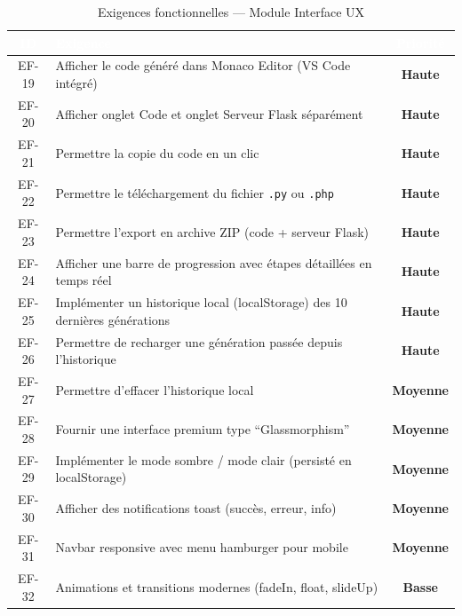 \documentclass[12pt,a4paper]{article}
\newcommand{\badge}[2]{%
  \colorbox{#1!15}{\textcolor{#1}{\small\textbf{#2}}}%
}
\newcommand{\highpriority}{\badge{dangered}{Haute}}
\newcommand{\mediumpriority}{\badge{warningorange}{Moyenne}}
\newcommand{\lowpriority}{\badge{successgreen}{Basse}}
\begin{document}
\begin{table}[H]
\centering
\renewcommand{\arraystretch}{1.3}
\begin{tabularx}{\textwidth}{|c|X|c|}
\hline
\rowcolor{darkblue!90}
\textcolor{white}{\textbf{ID}} &
\textcolor{white}{\textbf{Exigence}} &
\textcolor{white}{\textbf{Priorité}} \\
\hline
EF-19 & Afficher le code généré dans Monaco Editor (VS Code intégré) & \highpriority \\
\hline
\rowcolor{lightgray}
EF-20 & Afficher onglet Code et onglet Serveur Flask séparément & \highpriority \\
\hline
EF-21 & Permettre la copie du code en un clic & \highpriority \\
\hline
\rowcolor{lightgray}
EF-22 & Permettre le téléchargement du fichier \texttt{.py} ou \texttt{.php} & \highpriority \\
\hline
EF-23 & Permettre l'export en archive ZIP (code + serveur Flask) & \highpriority \\
\hline
\rowcolor{lightgray}
EF-24 & Afficher une barre de progression avec étapes détaillées en temps réel & \highpriority \\
\hline
EF-25 & Implémenter un historique local (localStorage) des 10 dernières générations & \highpriority \\
\hline
\rowcolor{lightgray}
EF-26 & Permettre de recharger une génération passée depuis l'historique & \highpriority \\
\hline
EF-27 & Permettre d'effacer l'historique local & \mediumpriority \\
\hline
\rowcolor{lightgray}
EF-28 & Fournir une interface premium type ``Glassmorphism'' & \mediumpriority \\
\hline
EF-29 & Implémenter le mode sombre / mode clair (persisté en localStorage) & \mediumpriority \\
\hline
\rowcolor{lightgray}
EF-30 & Afficher des notifications toast (succès, erreur, info) & \mediumpriority \\
\hline
EF-31 & Navbar responsive avec menu hamburger pour mobile & \mediumpriority \\
\hline
\rowcolor{lightgray}
EF-32 & Animations et transitions modernes (fadeIn, float, slideUp) & \lowpriority \\
\hline
\end{tabularx}
\caption{Exigences fonctionnelles — Module Interface UX}
\end{table}

\end{document}
